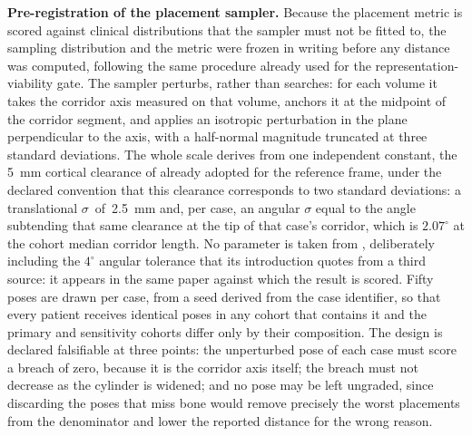 \documentclass[9pt]{extarticle}
\begin{document}
\textbf{Pre-registration of the placement sampler.} Because the placement metric is scored against clinical distributions that the sampler must not be fitted to, the sampling distribution and the metric were frozen in writing before any distance was computed, following the same procedure already used for the representation-viability gate. The sampler perturbs, rather than searches: for each volume it takes the corridor axis measured on that volume, anchors it at the midpoint of the corridor segment, and applies an isotropic perturbation in the plane perpendicular to the axis, with a half-normal magnitude truncated at three standard deviations. The whole scale derives from one independent constant, the 5~mm cortical clearance of \citet{kaiser2014dysmorphism} already adopted for the reference frame, under the declared convention that this clearance corresponds to two standard deviations: a translational \mbox{$\sigma$ of 2.5~mm} and, per case, an angular $\sigma$ equal to the angle subtending that same clearance at the tip of that case's corridor, which is $2.07^{\circ}$ at the cohort median corridor length. No parameter is taken from \citet{zwingmann2009navigated}, deliberately including the $4^{\circ}$ angular tolerance that its introduction quotes from a third source: it appears in the same paper against which the result is scored. Fifty poses are drawn per case, from a seed derived from the case identifier, so that every patient receives identical poses in any cohort that contains it and the primary and sensitivity cohorts differ only by their composition. The design is declared falsifiable at three points: the unperturbed pose of each case must score a breach of zero, because it is the corridor axis itself; the breach must not decrease as the cylinder is widened; and no pose may be left ungraded, since discarding the poses that miss bone would remove precisely the worst placements from the denominator and lower the reported distance for the wrong reason.
\end{document}
